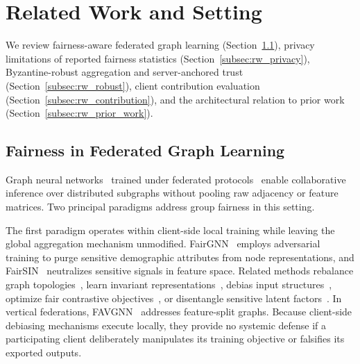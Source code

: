 \section{Related Work and Setting}
\label{sec:related_work}

We review fairness-aware federated graph learning (Section~\ref{subsec:rw_fairfl}), privacy limitations of reported fairness statistics (Section~\ref{subsec:rw_privacy}), Byzantine-robust aggregation and server-anchored trust (Section~\ref{subsec:rw_robust}), client contribution evaluation (Section~\ref{subsec:rw_contribution}), and the architectural relation to prior work (Section~\ref{subsec:rw_prior_work}).

\subsection{Fairness in Federated Graph Learning}
\label{subsec:rw_fairfl}

Graph neural networks~\citep{kipf2016semi, velickovic2017graph} trained under federated protocols~\citep{mcmahan2017communication, kairouz2021advances} enable collaborative inference over distributed subgraphs without pooling raw adjacency or feature matrices. Two principal paradigms address group fairness in this setting.

The first paradigm operates within client-side local training while leaving the global aggregation mechanism unmodified. FairGNN~\citep{dai2021say} employs adversarial training to purge sensitive demographic attributes from node representations, and FairSIN~\citep{yang2024fairsin} neutralizes sensitive signals in feature space. Related methods rebalance graph topologies~\citep{li2024fairgb}, learn invariant representations~\citep{zhu2024fairinv}, debias input structures~\citep{dong2022edits}, optimize fair contrastive objectives~\citep{agarwal2021towards}, or disentangle sensitive latent factors~\citep{lee2025dabgnn, fnrgnn2025}. In vertical federations, FAVGNN~\citep{wang2026favgnn} addresses feature-split graphs. Because client-side debiasing mechanisms execute locally, they provide no systemic defense if a participating client deliberately manipulates its training objective or falsifies its exported outputs.

